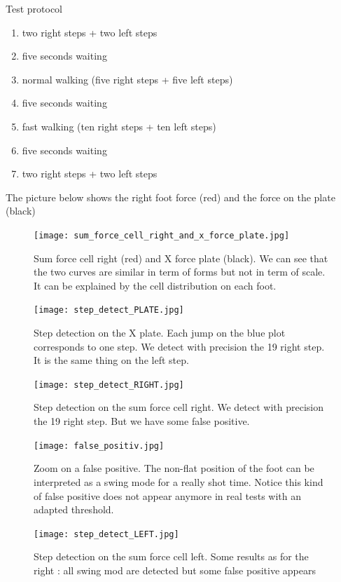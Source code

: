 \documentclass[a4paper,12pt]{article}
\begin{document}
Test protocol
\begin{enumerate}
  \item two right steps + two left steps
  \item five seconds waiting 
  \item normal walking (five right steps + five left steps)
  \item five seconds waiting
  \item fast walking (ten right steps + ten left steps)
  \item five seconds waiting
  \item two right steps + two left steps\\
\end{enumerate}

The picture below shows the right foot force (red) and the force on the plate (black)\\

\begin{figure}[H]
	\centering
	\texttt{[image: sum\_force\_cell\_right\_and\_x\_force\_plate.jpg]}
    \caption{Sum force cell right (red) and X force plate (black). We can see that the two curves are similar in term of forms but not in term of scale. It can be explained by the cell distribution on each foot.}
    \label{cellrightforceplate}
\end{figure}

\begin{figure}[H]
	\centering
	\texttt{[image: step\_detect\_PLATE.jpg]}
    \caption{Step detection on the X plate. Each jump on the blue plot corresponds to one step. We detect with precision the 19 right step. It is the same thing on the left step.}
\end{figure}

\begin{figure}[H]
	\centering
	\texttt{[image: step\_detect\_RIGHT.jpg]}
    \caption{Step detection on the sum force cell right. We detect with precision the 19 right step. But we have some false positive. }
\end{figure}

\begin{figure}[H]
	\centering
	\texttt{[image: false\_positiv.jpg]}
    \caption{Zoom on a false positive. The non-flat position of the foot can be interpreted as a swing mode for a really shot time. Notice this kind of false positive does not appear anymore in real tests with an adapted threshold.}
\end{figure}

\begin{figure}[H]
	\centering
	\texttt{[image: step\_detect\_LEFT.jpg]}
    \caption{Step detection on the sum force cell left. Some results as for the right : all swing mod are detected but some false positive appears}
\end{figure}
\end{document}
